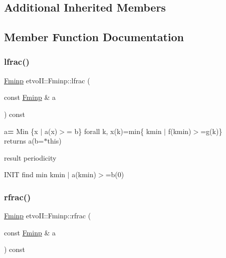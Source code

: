 \subsection*{Additional Inherited Members}


\subsection{Member Function Documentation}
\mbox{\label{classetvo_i_i_1_1_fminp_aa86878444d1a385114f03e6afd47374e}} 
\subsubsection{\texorpdfstring{lfrac()}{lfrac()}}
{\footnotesize\ttfamily \mbox{\hyperlink{classetvo_i_i_1_1_fminp}{Fminp}} etvo\+I\+I\+::\+Fminp\+::lfrac (\begin{DoxyParamCaption}\item[{const \mbox{\hyperlink{classetvo_i_i_1_1_fminp}{Fminp}} \&}]{a }\end{DoxyParamCaption}) const}

a{\bfseries =} Min \{x $\vert$ a(x)$>$= b\} forall k, x(k)=min\{ kmin $\vert$ f(kmin)$>$=g(k)\} ~\newline
~\newline
~\newline
 returns a{\bfseries }(b=$\ast$this)

result periodicity

I\+N\+IT find min kmin $\vert$ a(kmin)$>$=b(0) \mbox{\label{classetvo_i_i_1_1_fminp_acd8f776936d0d82fec1695bd7e973286}} 
\subsubsection{\texorpdfstring{rfrac()}{rfrac()}}
{\footnotesize\ttfamily \mbox{\hyperlink{classetvo_i_i_1_1_fminp}{Fminp}} etvo\+I\+I\+::\+Fminp\+::rfrac (\begin{DoxyParamCaption}\item[{const \mbox{\hyperlink{classetvo_i_i_1_1_fminp}{Fminp}} \&}]{a }\end{DoxyParamCaption}) const}

